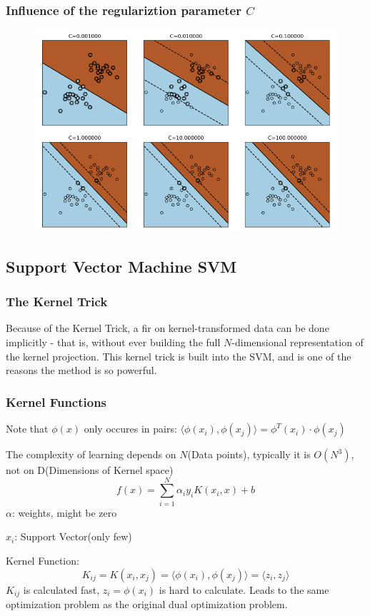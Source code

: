 \subsubsection*{Influence of the regulariztion parameter \(C\)}
\begin{figure}[!h]
    \includegraphics[width = \columnwidth]{figures/08/CExamples.png}
\end{figure}
\subsection{Support Vector Machine SVM}
\subsubsection{The Kernel Trick}
Because of the Kernel Trick, a fir on kernel-transformed data can be done implicitly - that is, without ever building the full \(N\)-dimensional representation of the kernel projection.
This kernel trick is built into the SVM, and is one of the reasons the method is so powerful.
\subsubsection{Kernel Functions}
Note that \(\phi(x)\) only occures in pairs: \(\langle \phi(x_i),\phi(x_j) \rangle = \phi^T(x_i)\cdot \phi(x_j)\)

The complexity of learning depends on \(N\)(Data points), typically it is \(O(N^3)\), not on D(Dimensions of Kernel space)
\[
f(x) = \sum_{i =1}^{N}\alpha_i y_i K(x_i,x) + b
\]
\(\alpha\): weights, might be zero

\(x_i\): Support Vector(only few)

Kernel Function:
\[
K_{ij} = K(x_i,x_j) = \langle \phi(x_i),\phi(x_j) \rangle = \langle z_i, z_j \rangle
\]
\(K_{ij}\) is calculated fast, \(z_i = \phi(x_i)\) is hard to calculate.
Leads to the same optimization problem as the original dual optimization problem.
